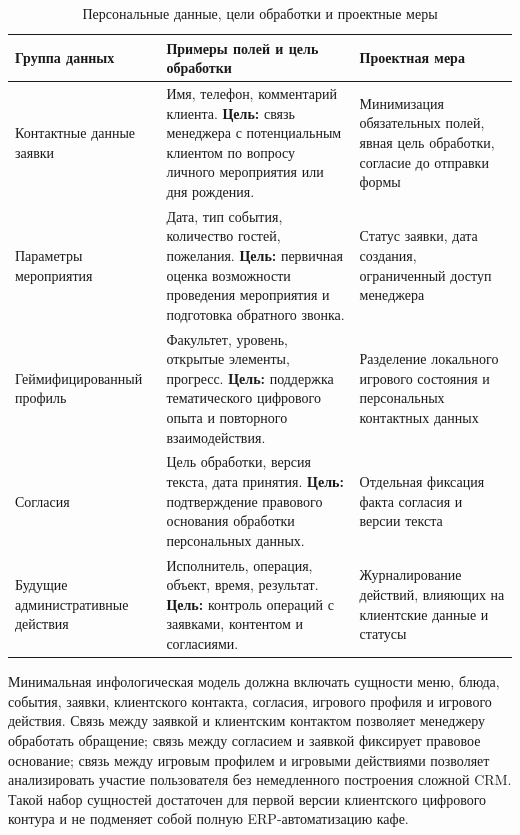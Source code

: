 \begin{table}[H]
\centering
\footnotesize
\caption{Персональные данные, цели обработки и проектные меры}
\label{tab:v2_personal_data_purposes}
\setlength{\tabcolsep}{4pt}
\begin{tabularx}{\textwidth}{|>{\raggedright\arraybackslash}p{}|>{\raggedright\arraybackslash}p{}|>{\raggedright\arraybackslash}X|}
\hline
\textbf{Группа данных} & \textbf{Примеры полей и цель обработки} & \textbf{Проектная мера} \\ \hline
Контактные данные заявки & Имя, телефон, комментарий клиента. \newline \textbf{Цель:} связь менеджера с потенциальным клиентом по вопросу личного мероприятия или дня рождения. & Минимизация обязательных полей, явная цель обработки, согласие до отправки формы \\ \hline
Параметры мероприятия & Дата, тип события, количество гостей, пожелания. \newline \textbf{Цель:} первичная оценка возможности проведения мероприятия и подготовка обратного звонка. & Статус заявки, дата создания, ограниченный доступ менеджера \\ \hline
Геймифицированный профиль & Факультет, уровень, открытые элементы, прогресс. \newline \textbf{Цель:} поддержка тематического цифрового опыта и повторного взаимодействия. & Разделение локального игрового состояния и персональных контактных данных \\ \hline
Согласия & Цель обработки, версия текста, дата принятия. \newline \textbf{Цель:} подтверждение правового основания обработки персональных данных. & Отдельная фиксация факта согласия и версии текста \\ \hline
Будущие административные действия & Исполнитель, операция, объект, время, результат. \newline \textbf{Цель:} контроль операций с заявками, контентом и согласиями. & Журналирование действий, влияющих на клиентские данные и статусы \\ \hline
\end{tabularx}
\normalsize
\end{table}

Минимальная инфологическая модель должна включать сущности меню, блюда, события, заявки, клиентского контакта, согласия, игрового профиля и игрового действия. Связь между заявкой и клиентским контактом позволяет менеджеру обработать обращение; связь между согласием и заявкой фиксирует правовое основание; связь между игровым профилем и игровыми действиями позволяет анализировать участие пользователя без немедленного построения сложной CRM. Такой набор сущностей достаточен для первой версии клиентского цифрового контура и не подменяет собой полную ERP-автоматизацию кафе.

